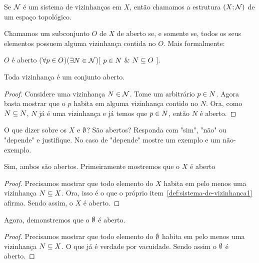 \begin{definition}
	Se $\mathcal{N}$ é um sistema de vizinhanças em $X$, então chamamos a estrutura $(X;\mathcal{N})$ de um espaço topológico.
\end{definition}

\begin{definition}
	Chamamos um subconjunto $O$ de $X$ de aberto se, e somente se, todos os seus elementos possuem alguma vizinhança contida no $O$. Mais formalmente:
	\begin{center}
		$O$ é aberto \sse ($\forall p \in O$)($\exists N \in \mathcal{N}$)[ $p \in N$ \& $N \subseteq O$ ].
	\end{center}
\end{definition}

\begin{fact}
	\label{vizinhanca-aberto}
	Toda vizinhança é um conjunto aberto.
\end{fact}

\begin{proof}
	Considere uma vizinhança $N \in \mathcal{N}$. Tome um arbitrário $p \in N$. Agora basta mostrar que o $p$ habita em alguma vizinhança contido no $N$. Ora, como $N \subseteq N$, $N$ já é uma vizinhança e já temos que $p \in N$, então $N$ é aberto.
\end{proof}

\begin{question}
	\label{universo-aberto}
	\label{vazio-aberto}
	O que dizer sobre os $X$ e $\emptyset$? São abertos? Responda com "sim", "não" ou "depende" e justifique. No caso de "depende" mostre um exemplo e um não-exemplo.
\end{question}

\begin{answer}
	Sim, ambos são abertos. Primeiramente mostremos que o $X$ é aberto
	\begin{proof}
		Precisamos mostrar que todo elemento do $X$ habita em pelo menos uma vizinhança $N \subseteq X$. Ora, isso é o que o próprio item~\ref{def:sistema-de-vizinhanca1} afirma. Sendo assim, o $X$ é aberto.
	\end{proof}
	Agora, demonstremos que o $\emptyset$ é aberto.
	\begin{proof}
		Precisamos mostrar que todo elemento do $\emptyset$ habita em pelo menos uma vizinhança $N \subseteq X$. O que já é verdade por vacuidade. Sendo assim o $\emptyset$ é aberto.
	\end{proof}
\end{answer}

